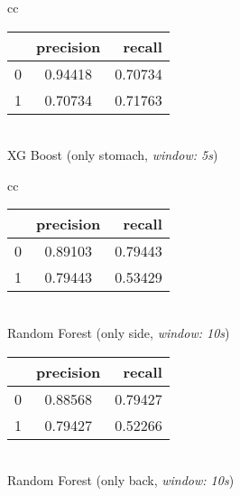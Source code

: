\begin{table}
\begin{tabular}{cc}
    \begin{minipage}{0.33\textwidth}
        \begin{center}
            \begin{tabular}{ | l | c | r | }
              \hline
               & precision & recall \\ \hline
              0 & 0.94418 & 0.70734 \\ \hline
              1 & 0.70734 & 0.71763 \\
              \hline
            \end{tabular}
            \smallskip 
            \\ XG Boost (only stomach, \textit{window: 5s})
        \end{center}
    \end{minipage}
\end{tabular}
\newline
\vspace*{5mm}
\newline
  \begin{tabular}{cc}    
      \begin{minipage}{.33\linewidth}
          \begin{center}
              \begin{tabular}{ | l | c | r | }
                \hline
                 & precision & recall \\ \hline
                0 & 0.89103 & 0.79443 \\ \hline
                1 & 0.79443 & 0.53429 \\
                \hline
              \end{tabular}
              \smallskip
              \\ Random Forest (only side, \textit{window: 10s})
          \end{center}
      \end{minipage}
  
      \begin{minipage}{.33\linewidth}
          \begin{center}
              \begin{tabular}{ | l | c | r | }
                \hline
                 & precision & recall \\ \hline
                0 & 0.88568 & 0.79427 \\ \hline
                1 & 0.79427 & 0.52266 \\
                \hline
              \end{tabular}
              \smallskip
              \\ Random Forest (only back, \textit{window: 10s})
          \end{center}
      \end{minipage}
 

\end{tabular}
\end{table}
